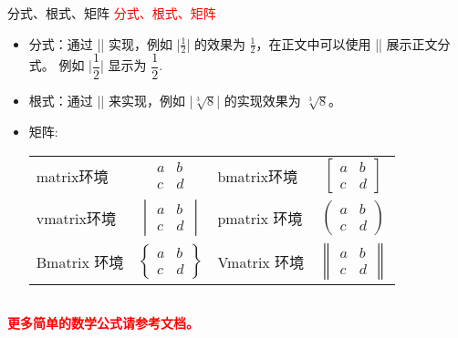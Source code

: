 \begin{frame}[fragile]{分式、根式、矩阵}
	\textcolor{red}{分式、根式、矩阵}
	\begin{itemize}
		\item 分式：通过 || 实现，例如 |$\frac 12$| 的效果为 $\frac 12$，在正文中可以使用 || 
		展示正文分式。 例如 |$\dfrac 12$| 显示为 $\dfrac 12$.
		\item  根式：通过 || 来实现，例如 |$\sqrt[3]{8}$| 的实现效果为 $\sqrt[3]{8}$。
		\item 矩阵:\\
		\begin{tabular}{lclc}
		matrix环境	& \qquad	$\begin{matrix}	a &   b \\	c &   d 	\end{matrix}$
		&	\qquad	bmatrix环境       &     $\begin{bmatrix}		a &   b \\c &   d 	\end{bmatrix}$		\\[1em]
		vmatrix环境 	&	\qquad 	 	$\begin{vmatrix}		a &   b \\c &   d 	\end{vmatrix}$			
		& \qquad pmatrix 环境	&	 $\begin{pmatrix}		a &   b \\c &   d 	\end{pmatrix}$		\\[1em]
		Bmatrix 环境			&	\qquad 	$\begin{Bmatrix}		a &   b \\c &   d 	\end{Bmatrix}$		
		&\qquad Vmatrix 环境			&	 	$\begin{Vmatrix}		a &   b \\c &   d 	\end{Vmatrix}$	
		\end{tabular}
		\begin{tabular}{llll}
			
		\end{tabular}
	\end{itemize}
	\phantom{幻影幻影幻影幻影} \textcolor{red}{\bfseries 更多简单的数学公式请参考文档。}
\end{frame}

